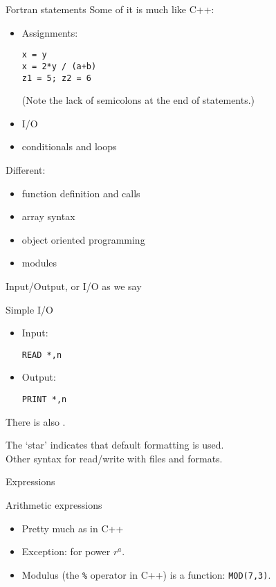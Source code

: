 \begin{block}{Fortran statements}
  \label{sl:fstatements}
  Some of it is much like C++:
  \begin{itemize}
  \item Assignments:
\begin{lstlisting}
x = y
x = 2*y / (a+b)
z1 = 5; z2 = 6
\end{lstlisting}
(Note the lack of semicolons at the end of statements.)
\item I/O
\item conditionals and loops
  \end{itemize}
Different:
\begin{itemize}
\item function definition and calls
\item array syntax
\item object oriented programming
\item modules
\end{itemize}
\end{block}

 {Input/Output, or I/O as we say}
\label{sec:fio}

\begin{block}{Simple I/O}
  \label{sl:frw}
  \begin{itemize}
  \item Input: 
\begin{lstlisting}
READ *,n
\end{lstlisting}
\item Output:
\begin{lstlisting}
PRINT *,n
\end{lstlisting}
  \end{itemize}
  There is also .

  The `star' indicates that default formatting is used.\\
  Other syntax for read/write with files and formats.
\end{block}

 {Expressions}
\label{sec:fexpr}

\begin{block}{Arithmetic expressions}
  \label{sl:farith}
  \begin{itemize}
  \item Pretty much as in C++
  \item Exception:  for power $r^a$.
  \item Modulus (the \lstinline+%+ operator in C++)
    is a function: \lstinline{MOD(7,3)}.
  \end{itemize}
\end{block}

